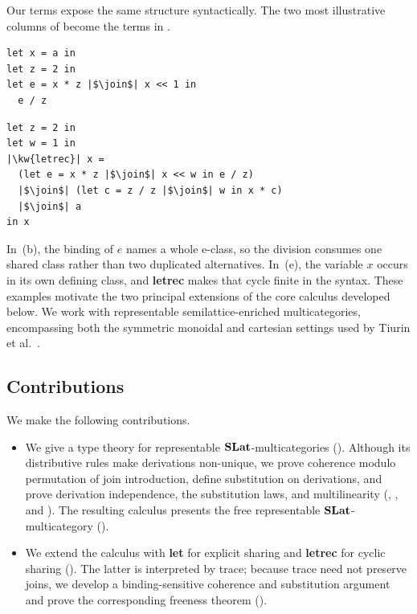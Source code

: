 Our terms expose the same structure syntactically.  The two most illustrative
columns of  become the terms in
.
\begin{listing*}[t]
\centering
\begin{minipage}[t]{0.43\textwidth}
  \begin{verbatim}
let x = a in
let z = 2 in
let e = x * z |$\join$| x << 1 in
  e / z
  \end{verbatim}
\end{minipage}
\hfill
\begin{minipage}[t]{0.53\textwidth}
  \begin{verbatim}
let z = 2 in
let w = 1 in
|\kw{letrec}| x =
  (let e = x * z |$\join$| x << w in e / z)
  |$\join$| (let c = z / z |$\join$| w in x * c)
  |$\join$| a
in x
  \end{verbatim}
\end{minipage}
\caption{Terms for e-graphs (b) and (e) of
  .}
\label{lst:terms-e-graph}
\end{listing*}
In~(b), the binding of $e$ names a whole e-class, so the division consumes one
shared class rather than two duplicated alternatives.  In~(e), the variable
$x$ occurs in its own defining class, and \textbf{letrec} makes that cycle
finite in the syntax.  These examples motivate the two principal extensions
of the core calculus developed below.  We work with representable
semilattice-enriched multicategories, encompassing both the symmetric
monoidal and cartesian settings used by Tiurin et
al.~\cite{tiurin2025equivalencehypergraphsdporewriting}.

\subsection{Contributions}

We make the following contributions.
\begin{itemize}
  \item We give a type theory for representable $\mathbf{SLat}$-multicategories
  ().  Although its distributive rules make
  derivations non-unique, we prove coherence modulo permutation of join
  introduction, define substitution on derivations, and prove derivation
  independence, the substitution laws, and multilinearity
  (,
  , and
  ).
  The resulting calculus presents the free representable
  $\mathbf{SLat}$-multicategory ().

  \item We extend the calculus with \textbf{let} for explicit sharing and
  \textbf{letrec} for cyclic sharing
  ().  The latter is
  interpreted by trace; because trace need not preserve joins, we develop a
  binding-sensitive coherence and substitution argument and prove the
  corresponding freeness theorem ().
\end{itemize}
